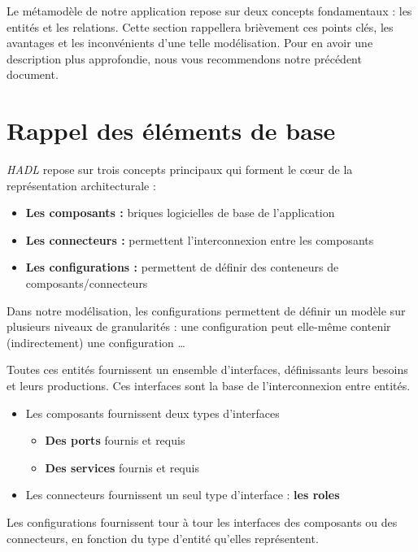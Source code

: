     Le métamodèle de notre application repose sur deux concepts fondamentaux : les entités et les relations. Cette section rappellera brièvement ces points clés, les avantages et les inconvénients d'une telle modélisation. Pour en avoir une description plus approfondie, nous vous recommendons notre précédent document.
    
    \section{Rappel des éléments de base}
    	
        \emph{HADL} repose sur trois concepts principaux qui forment le c\oe{}ur de la représentation architecturale : 
        \begin{itemize}
        	\item \textbf{Les composants :} briques logicielles de base de l'application
            \item \textbf{Les connecteurs :} permettent l'interconnexion entre les composants
            \item \textbf{Les configurations :} permettent de définir des conteneurs de composants/connecteurs
        \end{itemize}
        
        Dans notre modélisation, les configurations permettent de définir un modèle sur plusieurs niveaux de granularités : une configuration peut elle-même contenir (indirectement) une configuration \ldots
        \newline
        
        Toutes ces entités fournissent un ensemble d'interfaces, définissants leurs besoins et leurs productions. Ces interfaces sont la base de l'interconnexion entre entités.
        \begin{itemize}
        	\item Les composants fournissent deux types d'interfaces
            \begin{itemize}
            	\item \textbf{Des ports} fournis et requis
                \item \textbf{Des services} fournis et requis
            \end{itemize}
            \item Les connecteurs fournissent un seul type d'interface : \textbf{les roles}
        \end{itemize}
        
        Les configurations fournissent tour à tour les interfaces des composants ou des connecteurs, en fonction du type d'entité qu'elles représentent.
        \newline
        
